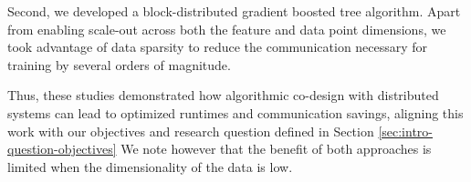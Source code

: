 Second, we developed a block-distributed gradient boosted tree
algorithm. Apart from enabling scale-out across both the feature
and data point dimensions, we took advantage of data sparsity
to reduce the communication necessary for training by several
orders of magnitude.

Thus, these studies demonstrated how
algorithmic co-design with distributed systems can lead
to optimized runtimes and communication savings, aligning
this work with our objectives and research question
defined in Section \ref{sec:intro-question-objectives}
We note however that the benefit of both approaches
is limited when the dimensionality of the data is low.